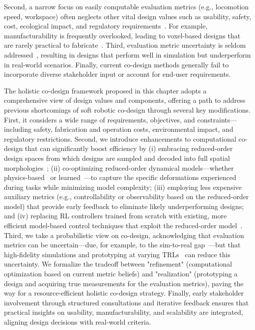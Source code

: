 % 
Second, a narrow focus on easily computable evaluation metrics (e.g., locomotion speed, workspace) often neglects other vital design values such as usability, safety, cost, ecological impact, and regulatory requirements~\citep{junge2022leveraging}. For example, manufacturability is frequently overlooked, leading to voxel-based designs that are rarely practical to fabricate~\citep{legrand2023reconfigurable, wang2024diffusebot}.
% 
Third, evaluation metric uncertainty is seldom addressed~\citep{chen2020design}, resulting in designs that perform well in simulation but underperform in real-world scenarios.
% 
Finally, current co-design methods generally fail to incorporate diverse stakeholder input or account for end-user requirements.

The holistic co-design framework proposed in this chapter adopts a comprehensive view of design values and components, offering a path to address previous shortcomings of soft robotic co-design through several key modifications. First, it considers a wide range of requirements, objectives, and constraints—including safety, fabrication and operation costs, environmental impact, and regulatory restrictions. Second, we introduce enhancements to computational co-design that can significantly boost efficiency by (i) embracing reduced-order design spaces from which designs are sampled and decoded into full spatial morphologies~\citep{wang2024diffusebot}; (ii) co-optimizing reduced-order dynamical models—whether physics-based~\citep{armanini2023soft} or learned~\citep{liu2024physics, alkayas2025soft, stolzle2024input, valadas2025learning, navez2025modeling}—to capture the specific deformations experienced during tasks while minimizing model complexity; (iii) employing less expensive auxiliary metrics (e.g., controllability or observability based on the reduced-order model) that provide early feedback to eliminate likely underperforming designs; and (iv) replacing RL controllers trained from scratch with existing, more efficient model-based control techniques that exploit the reduced-order model~\citep{della2023model, stolzle2024input}. Third, we take a probabilistic view on co-design, acknowledging that evaluation metrics can be uncertain—due, for example, to the sim-to-real gap~\citep{dubied2022sim}—but that high-fidelity simulations and prototyping at varying \glspl{TRL}~\citep{NASA_TRL} can reduce this uncertainty. We formalize the tradeoff between "refinement" (computational optimization based on current metric beliefs) and "realization" (prototyping a design and acquiring true measurements for the evaluation metrics), paving the way for a resource-efficient holistic co-design strategy. Finally, early stakeholder involvement through structured consultations and iterative feedback ensures that practical insights on usability, manufacturability, and scalability are integrated, aligning design decisions with real-world criteria.

